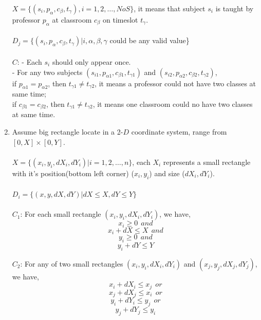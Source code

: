 \documentclass{article}
\begin{document}
\begin{enumerate}
$X = \{ (s_i, p_\alpha, c_\beta, t_\gamma), i=1,2,\dots,NoS\}$, it means that subject $s_i$ is taught by professor $p_\alpha$ at classroom $c_\beta$ on timeslot $t_\gamma$. \\ \\
$D_j = \{ (s_i, p_\alpha, c_\beta, t_\gamma) | i,\alpha,\beta,\gamma$ could be any valid value\} \\ \\
$C$: - Each $s_i$ should only appear once. \\
- For any two subjects $(s_{i1}, p_{\alpha1}, c_{\beta1}, t_{\gamma1})$ and $(s_{i2}, p_{\alpha2}, c_{\beta2}, t_{\gamma2})$, \\
if $p_{\alpha1}=p_{\alpha2}$, then $t_{\gamma1} \neq t_{\gamma2}$, it means a professor could not have two classes at same time; \\
if $c_{\beta1}=c_{\beta2}$, then $t_{\gamma1} \neq t_{\gamma2}$, it means one classroom could no have two classes at same time.

\item
Assume big rectangle locate in a 2-$D$ coordinate system, range from $[0,X]\times[0,Y]$. \\ \\
$X = \{(x_i,y_i,dX_i,dY_i) | i=1,2,\dots,n\}$, each $X_i$ represents a small rectangle with it's position(bottom left corner) ($x_i,y_i$) and size ($dX_i,dY_i$). \\ \\
$D_i = \{(x,y,dX,dY) | dX \leqslant X, dY \leqslant Y\}$ \\ \\
$C_1$: For each small rectangle $(x_i,y_i,dX_i,dY_i)$, we have,
$$ x_i \geqslant 0 ~~and $$
$$ x_i+dX \leqslant X ~~and $$
$$ y_i \geqslant 0 ~~and $$
$$ y_i+dY \leqslant Y $$

$C_2$: For any of two small rectangles $(x_i,y_i,dX_i,dY_i)$ and $(x_j,y_j,dX_j,dY_j)$, we have,
$$ x_i + dX_i \leqslant x_j ~~or $$
$$ x_j + dX_j \leqslant x_i ~~or $$
$$ y_i + dY_i \leqslant y_j ~~or $$
$$ y_j + dY_j \leqslant y_i $$






\end{enumerate}
\end{document}
